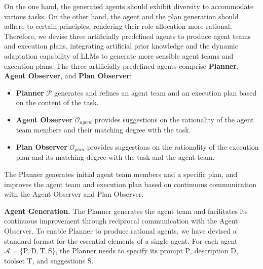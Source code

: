 On the one hand, the generated agents should exhibit diversity to accommodate various tasks. On the other hand, the agent and the plan generation should adhere to certain principles, rendering their role allocation more rational. Therefore, we devise three artificially predefined agents to produce agent teams and execution plans, integrating artificial prior knowledge and the dynamic adaptation capability of LLMs to generate more sensible agent teams and execution plans. The three artificially predefined agents comprise \textbf{Planner}, \textbf{Agent Observer}, and \textbf{Plan Observer}:
\begin{itemize} %
\item \textbf{Planner} $\mathcal{P}$ generates and refines an agent team and an execution plan based on the content of the task.
\item \textbf{Agent Observer} $\mathcal{O}_{agent}$ provides suggestions on the rationality of the agent team members and their matching degree with the task.
\item \textbf{Plan Observer} $\mathcal{O}_{plan}$ provides suggestions on the rationality of the execution plan and its matching degree with the task and the agent team.
\end{itemize}
The Planner generates initial agent team members and a specific plan, and improves the agent team and execution plan based on continuous communication with the Agent Observer and Plan Observer.

\noindent
\textbf{Agent Generation.}
The Planner generates the agent team and facilitates its continuous improvement through reciprocal communication with the Agent Observer. 
To enable Planner to produce rational agents, we have devised a standard format for the essential elements of a single agent. For each agent $\mathcal{A} = \{\mathrm{P}, \mathrm{D}, \mathrm{T}, \mathrm{S}\}$, the Planner needs to specify its prompt $\mathrm{P}$, description $\mathrm{D}$, toolset $\mathrm{T}$, and suggestions $\mathrm{S}$.  

